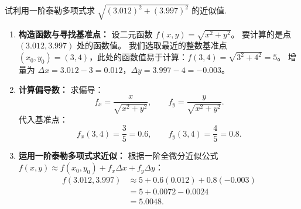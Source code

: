 \documentclass[lang=cn,11pt]{elegantbook}
\begin{document}
\begin{exercise}
试利用一阶泰勒多项式求 $\sqrt{(3.012)^2 + (3.997)^2}$ 的近似值.
\end{exercise}
\begin{solution}
\begin{enumerate}
  \item \textbf{构造函数与寻找基准点：}
  设二元函数 $f(x,y) = \sqrt{x^2+y^2}$。
  要计算的是点 $(3.012, 3.997)$ 处的函数值。
  我们选取最近的整数基准点 $(x_0, y_0) = (3, 4)$，此处的函数值易于计算：$f(3,4) = \sqrt{3^2+4^2} = 5$。
  增量为 $\Delta x = 3.012 - 3 = 0.012$，$\Delta y = 3.997 - 4 = -0.003$。
  
  \item \textbf{计算偏导数：}
  求偏导：
  \[ f_x = \frac{x}{\sqrt{x^2+y^2}}, \qquad f_y = \frac{y}{\sqrt{x^2+y^2}}. \]
  代入基准点：
  \[ f_x(3,4) = \frac{3}{5} = 0.6, \qquad f_y(3,4) = \frac{4}{5} = 0.8. \]
  
  \item \textbf{运用一阶泰勒多项式求近似：}
  根据一阶全微分近似公式 $f(x,y) \approx f(x_0,y_0) + f_x \Delta x + f_y \Delta y$：
  \begin{align*}
  f(3.012, 3.997) &\approx 5 + 0.6(0.012) + 0.8(-0.003) \\
  &= 5 + 0.0072 - 0.0024 \\
  &= 5.0048.
  \end{align*}
\end{enumerate}
\end{solution}
\end{document}
